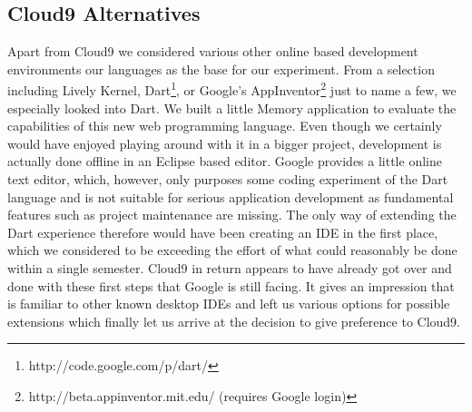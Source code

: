 \subsection{Cloud9 Alternatives}
Apart from Cloud9 we considered various other online based development environments our languages as the base for our experiment. From a selection including Lively Kernel, Dart\footnote{http://code.google.com/p/dart/}, or Google's AppInventor\footnote{http://beta.appinventor.mit.edu/ (requires Google login)} just to name a few, we especially looked into Dart. We built a little Memory application to evaluate the capabilities of this new web programming language. Even though we certainly would have enjoyed playing around with it in a bigger project, development is actually done offline in an Eclipse based editor. Google provides a little online text editor, which, however, only purposes some coding experiment of the Dart language and is not suitable for serious application development as fundamental features such as project maintenance are missing. The only way of extending the Dart experience therefore would have been creating an IDE in the first place, which we considered to be exceeding the effort of what could reasonably be done within a single semester. Cloud9 in return appears to have already got over and done with these first steps that Google is still facing. It gives an impression that is familiar to other known desktop IDEs and left us various options for possible extensions which finally let us arrive at the decision to give preference to Cloud9.